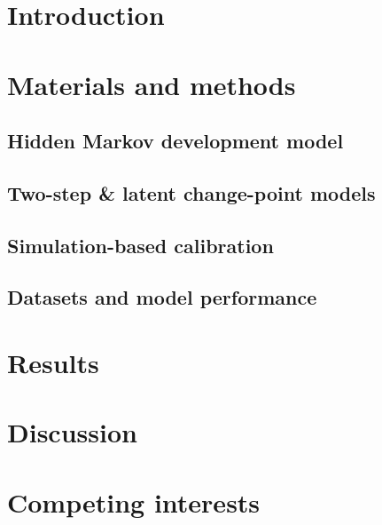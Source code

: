 \documentclass[12pt]{article}
\author[]{}
\begin{document}
\maketitle
\linenumbers



\section{Introduction}
\label{sec:introduction}


\section{Materials and methods}
\label{sec:methods}

\subsection{Hidden Markov development model}


\subsection{Two-step & latent change-point models}


\subsection{Simulation-based calibration}


\subsection{Datasets and model performance}


\section{Results}
\label{sec:results}


\section{Discussion}
\label{sec:discussion}


\section{Competing interests}
\label{sec:interests}





\end{document}
